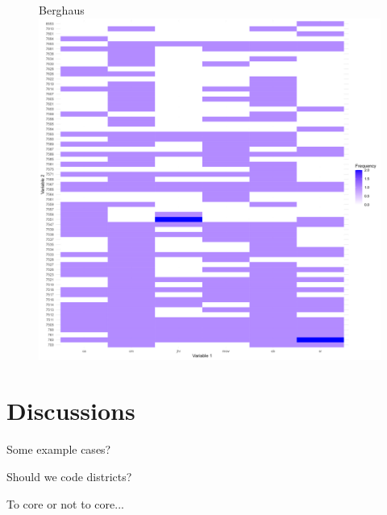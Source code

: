 \documentclass{beamer}
\begin{document}
\begin{frame}{}

	\begin{figure}[htpb]{Berghaus}
		\centering
		\includegraphics[width=\linewidth]{img/MicrosoftTeams-image (3).png}
		\label{Berghaus}
	\end{figure}

\end{frame}

\section{Discussions} \label{Discussions}

\begin{frame}{}

Some example cases?	

\end{frame}

\begin{frame}{}

Should we code districts?	

\end{frame}

\begin{frame}{}

To core or not to core...	

\end{frame}
\end{document}
